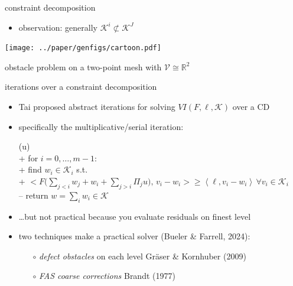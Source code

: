\documentclass[svgnames,
               hyperref={colorlinks,citecolor=DeepPink4,linkcolor=FireBrick,urlcolor=Maroon},
               usepdftitle=false]  %
               {beamer}
\newcommand{\RR}{\mathbb{R}}
\newcommand{\cK}{\mathcal{K}}
\newcommand{\ip}[2]{\left<#1,#2\right>}
\begin{document}
\begin{frame}{constraint decomposition}

\begin{itemize}
\item observation: generally $\mathcal{K}^i \not\subset \mathcal{K}^J$
\end{itemize}

\bigskip
\begin{center}
\texttt{[image: ../paper/genfigs/cartoon.pdf]}

\medskip
{\small obstacle problem on a two-point mesh with $\mathcal{V} \cong \RR^2$}
\end{center}
\end{frame}


\begin{frame}{iterations over a constraint decomposition}

\begin{itemize}
\item Tai proposed abstract iterations for solving $VI(F,\ell,\mathcal{K})$ over a CD
\item specifically the multiplicative/serial iteration:

{\small
\begin{pseudo}[left-margin=-5mm]
(u)\text{:} \\+
    for $i = 0,\dots,m-1$: \\+
        find $w_i\in \cK_i$ s.t. \\+
            $\displaystyle \Big<F\Big(\sum_{j<i} w_j + w_i + \sum_{j>i} \Pi_j u\Big),\, v_i - w_i\Big> \ge \ip{\ell}{v_i - w_i} \,\forall v_i \in \cK_i$ \\--
    return $w=\sum_i w_i\in\cK$
\end{pseudo}
}

\item \dots but not practical because you evaluate residuals on finest level
\item two techniques make a practical solver (Bueler \& Farrell, 2024):

    \begin{itemize}
    \item[$\circ$] \emph{defect obstacles} on each level  \hfill {\scriptsize Gr\"aser \& Kornhuber (2009)}
    \item[$\circ$] \emph{FAS coarse corrections}  \hfill {\scriptsize Brandt (1977)}
    \end{itemize}
\end{itemize}
\end{frame}
\end{document}
